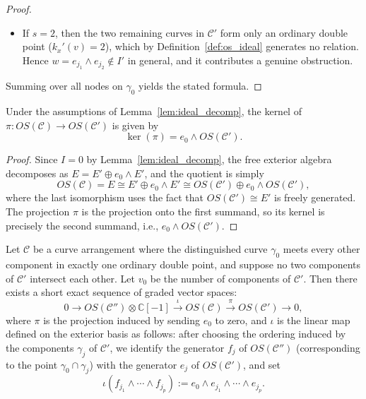 \documentclass[article,11pt]{amsart} \numberwithin{equation}{section}
\numberwithin{equation}{section}
\begin{document}
{\begin{proof}
\begin{itemize}
		\item If $s=2$, then the two remaining curves in $\mathcal C'$ form only an ordinary double point ($k_x'(v)=2$), which by Definition~\ref{def:os_ideal} generates no relation. Hence $w=e_{j_1}\wedge e_{j_2}\notin I'$ in general, and it contributes a genuine obstruction.
	\end{itemize}
	
	Summing over all nodes on $\gamma_0$ yields the stated formula.
\end{proof}



\begin{lm}
	\label{lem:kernel_decomp}
	Under the assumptions of Lemma~\ref{lem:ideal_decomp}, the kernel of
	$\pi: OS(\mathcal C) \longrightarrow OS(\mathcal C')$ is given by
	\[
	\ker(\pi) = e_0 \wedge OS(\mathcal C').
	\]
\end{lm}

\begin{proof}
	Since $I = 0$ by Lemma~\ref{lem:ideal_decomp}, the free exterior algebra
	decomposes as $E = E' \oplus e_0 \wedge E'$, and the quotient is simply
	\[
	OS(\mathcal C) = E \cong E' \oplus e_0 \wedge E'
	\cong OS(\mathcal C') \oplus e_0 \wedge OS(\mathcal C'),
	\]
	where the last isomorphism uses the fact that $OS(\mathcal C') \cong E'$
	is freely generated. The projection $\pi$ is the projection onto the
	first summand, so its kernel is precisely the second summand, i.e.,
	$e_0 \wedge OS(\mathcal C')$.
\end{proof}

\begin{thm}
	\label{thm:categorified_dr}
	Let $\mathcal C$ be a curve arrangement where the distinguished curve
	$\gamma_0$ meets every other component in exactly one ordinary double point,
	and suppose no two components of $\mathcal C'$ intersect each other.
	Let $v_0$ be the number of components of $\mathcal C'$.
	Then there exists a short exact sequence of graded vector spaces:
	\[
	0 \longrightarrow OS(\mathcal C'') \otimes \mathbb{C}[-1]
	\xrightarrow{\,\iota\,}
	OS(\mathcal C)
	\xrightarrow{\,\pi\,}
	OS(\mathcal C')
	\longrightarrow 0,
	\]
	where $\pi$ is the projection induced by sending $e_0$ to zero, and $\iota$
	is the linear map defined on the exterior basis as follows: after choosing
	the ordering induced by the components $\gamma_j$ of $\mathcal C'$, we
	identify the generator $f_j$ of $OS(\mathcal C'')$ (corresponding to the
	point $\gamma_0 \cap \gamma_j$) with the generator $e_j$ of $OS(\mathcal C')$,
	and set
	\[
	\iota(f_{j_1} \wedge \cdots \wedge f_{j_p})
	:= e_0 \wedge e_{j_1} \wedge \cdots \wedge e_{j_p}.
	\]
\end{thm}

}
\end{document}
